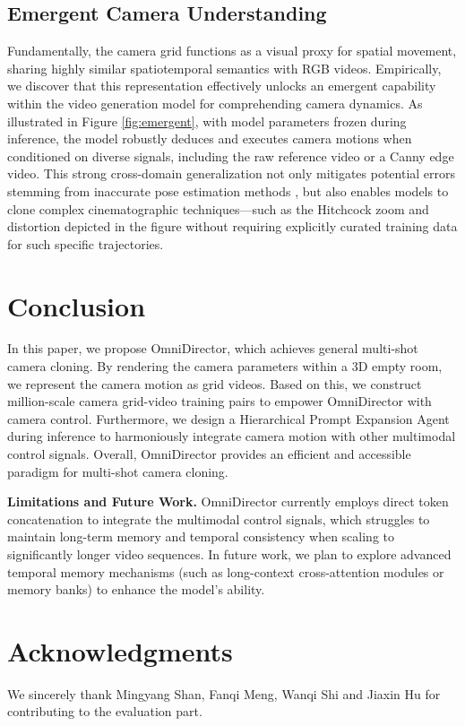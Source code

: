 \documentclass{llmxive}
\begin{document}
\subsection{Emergent Camera Understanding}

Fundamentally, the camera grid functions as a visual proxy for spatial movement, sharing highly similar spatiotemporal semantics with RGB videos. Empirically, we discover that this representation effectively unlocks an emergent capability within the video generation model for comprehending camera dynamics. As illustrated in Figure \ref{fig:emergent}, with model parameters frozen during inference, the model robustly deduces and executes camera motions when conditioned on diverse signals, including the raw reference video or a Canny edge video. This strong cross-domain generalization not only mitigates potential errors stemming from inaccurate pose estimation methods \cite{lin2025dpa3, keetha2026mapanything}, but also enables models to clone complex cinematographic techniques—such as the Hitchcock zoom and distortion depicted in the figure without requiring explicitly curated training data for such specific trajectories.

\section{Conclusion}

In this paper, we propose OmniDirector, which achieves general multi-shot camera cloning. By rendering the camera parameters within a 3D empty room, we represent the camera motion as grid videos. Based on this, we construct million-scale camera grid-video training pairs to empower OmniDirector with camera control. Furthermore, we design a Hierarchical Prompt Expansion Agent during inference to harmoniously integrate camera motion with other multimodal control signals. Overall, OmniDirector provides an efficient and accessible paradigm for multi-shot camera cloning.

\noindent\textbf{Limitations and Future Work.}  
OmniDirector currently employs direct token concatenation to integrate the multimodal control signals, which struggles to maintain long-term memory and temporal consistency when scaling to significantly longer video sequences. 
In future work, we plan to explore advanced temporal memory mechanisms (such as long-context cross-attention modules or memory banks) to enhance the model's ability.



\section*{Acknowledgments}
\bigskip
\noindent We sincerely thank Mingyang Shan, Fanqi Meng, Wanqi Shi and Jiaxin Hu for contributing to the evaluation part.


\end{document}
